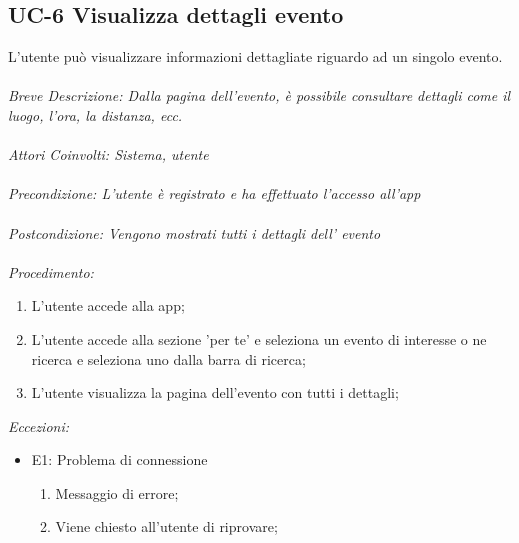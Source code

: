 \subsection{UC-6 Visualizza dettagli evento}
L'utente può visualizzare informazioni dettagliate riguardo ad un singolo evento.
\\
\\
\textit{Breve Descrizione: Dalla pagina dell'evento, è possibile consultare dettagli come il luogo, l'ora, la distanza, ecc.} 
\\
\\
\textit{Attori Coinvolti: Sistema, utente}
\\
\\
\textit{Precondizione: L'utente è registrato e ha effettuato l'accesso all'app}
\\
\\
\textit{Postcondizione: Vengono mostrati tutti i dettagli dell' evento}
\\
\\
\textit{Procedimento:}
\begin{enumerate}
  \item L'utente accede alla app;
	\item L'utente accede alla sezione 'per te' e seleziona un evento di interesse o ne ricerca e seleziona uno dalla barra di ricerca;
	\item L'utente visualizza la pagina dell'evento con tutti i dettagli;
\end{enumerate}


\textit{Eccezioni:}
\begin{itemize}
	\item E1: Problema di connessione
	\begin{enumerate}
    \item Messaggio di errore;
		\item Viene chiesto all'utente di riprovare;
	\end{enumerate}
\end{itemize}
